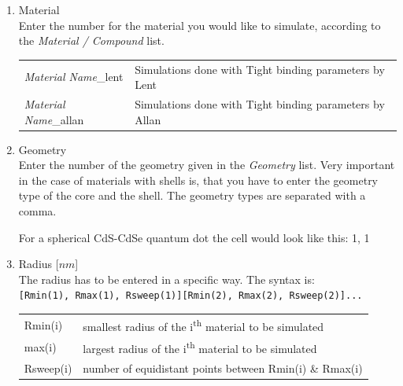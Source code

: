 			\begin{enumerate}
				\item Material		\\
							Enter the number for the material you would like to simulate, according to the {\it Material / Compound} list. \\
							\begin{tabular}{ll}
								{\it Material Name}\_lent		&	Simulations done with Tight binding parameters by Lent	\\
								{\it Material Name}\_allan	&	Simulations done with Tight binding parameters by Allan	\\
							\end{tabular}
				\item Geometry		\\
							Enter the number of the geometry given in the {\it Geometry} list. Very important in the case of materials with
							shells is, that you have to enter the geometry type of the core and the shell. The geometry types are separated	
							with a comma.
							\begin{EXAMPLE}
								For a spherical CdS-CdSe quantum dot the cell would look like this: 1, 1
							\end{EXAMPLE}
				\item Radius [$nm$]			\\
							The radius has to be entered in a specific way. The syntax is: 						\\
							\lstinline{[Rmin(1), Rmax(1), Rsweep(1)][Rmin(2), Rmax(2), Rsweep(2)]...} \\
							\newline
							\begin{tabular}{@{}ll}
								Rmin(i)		& smallest radius of the i\textsuperscript{th} material to be simulated		\\
								max(i)		& largest radius of the i\textsuperscript{th} material to be simulated		\\
								Rsweep(i)	& number of equidistant points between Rmin(i) \& Rmax(i)									\\
							\end{tabular}
							

\end{enumerate}
